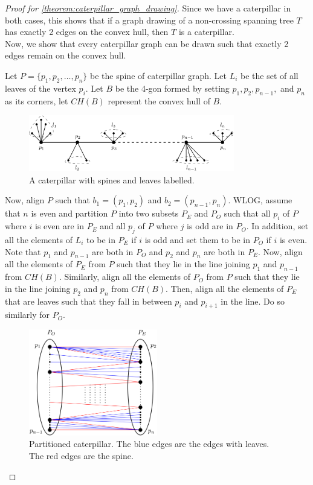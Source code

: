\documentclass{article}
\begin{document}
\begin{proof}[Proof for \ref{theorem:caterpillar_graph_drawing}]
	Since we have a caterpillar in both cases, this shows that if a graph drawing of a non-crossing spanning tree $T$ has exactly 2 edges on the convex hull, then $T$ is a caterpillar.
	\\

	Now, we show that every caterpillar graph can be drawn such that exactly 2 edges remain on the convex hull.

	Let $P = \{p_1, p_2, \dots, p_n\}$ be the spine of caterpillar graph. Let $L_i$ be the set of all leaves of the vertex $p_i$.
	Let $B$ be the 4-gon formed by setting $p_1, p_2, p_{n - 1},$ and $p_n$ as its corners, let $CH(B)$ represent the convex hull of $B$.

	\begin{figure}[hbt!]
		\centering
		\includegraphics[width=0.8\textwidth]{spine}
		\caption{A caterpillar with spines and leaves labelled.}
	\end{figure}
	\newpage

	Now, align $P$ such that $b_1 = (p_1, p_2)$ and $b_2 = (p_{n - 1}, p_n)$. WLOG, assume that $n$ is even and partition $P$ into two subsets $P_E$ and $P_O$ such that all $p_i$ of $P$ where $i$ is even are in $P_E$ and all $p_j$ of $P$ where $j$ is odd are in $P_O$. In addition, set all the elements of $L_i$ to be in $P_E$ if $i$ is odd and set them to be in $P_O$ if $i$ is even. Note that $p_1$ and $p_{n - 1}$ are both in $P_O$ and $p_2$ and $p_n$ are both in $P_E$. Now, align all the elements of $P_E$ from $P$ such that they lie in the line joining $p_1$ and $p_{n - 1}$ from $CH(B)$. Similarly, align all the elements of $P_O$ from $P$ such that they lie in the line joining $p_2$ and $p_n$ from $CH(B)$. Then, align all the elements of $P_E$ that are leaves such that they fall in between $p_i$ and $p_{i + 1}$ in the line. Do so similarly for $P_O$.


	\begin{figure}[hbt!]
		\centering
		\includegraphics[width=0.5\textwidth]{partitioned_caterpillar}
		\caption{Partitioned caterpillar. The blue edges are the edges with leaves. The red edges are the spine.}
	\end{figure}


\end{proof}
\end{document}
